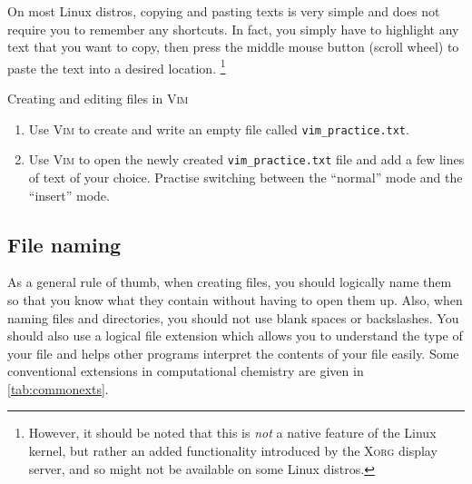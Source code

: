     On most Linux distros, copying and pasting texts is very simple and does not require you to remember any shortcuts.
    In fact, you simply have to highlight any text that you want to copy, then press the middle mouse button (scroll wheel) to paste the text into a desired location.%
    \footnote{However, it should be noted that this is \emph{not} a native feature of the Linux kernel, but rather an added functionality introduced by the \textsc{Xorg} display server, and so might not be available on some Linux distros.}

    \begin{task}[label=task:vimintro]{Creating and editing files in \textsc{Vim}}
      \begin{enumerate}[label=(\alph*)]
        \item Use \textsc{Vim} to create and write an empty file called \texttt{vim\_practice.txt}.
        \item Use \textsc{Vim} to open the newly created \texttt{vim\_practice.txt} file and add a few lines of text of your choice. Practise switching between the \enquote{normal} mode and the \enquote{insert} mode.
      \end{enumerate}
    \end{task}


  \subsection{File naming}

    As a general rule of thumb, when creating files, you should logically name them so that you know what they contain without having to open them up.
    Also, when naming files and directories, you should not use blank spaces or backslashes.
    You should also use a logical file extension which allows you to understand the type of your file and helps other programs interpret the contents of your file easily.
    Some conventional extensions in computational chemistry are given in \cref{tab:commonexts}.

